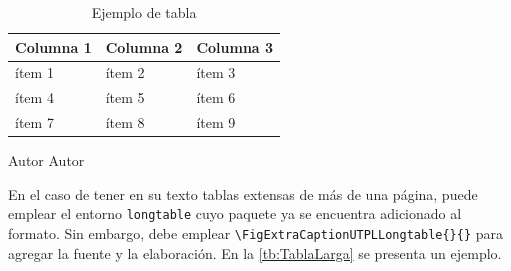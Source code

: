 \begin{table}[]
	\centering
	\captionsetup{width=0.44\textwidth}
	\caption{Ejemplo de tabla}
	\label{tb:Ejemplo}
	\begin{tabular}{|l|l|l|}
		\hline
		\textbf{Columna 1} & \textbf{Columna 2} & \textbf{Columna 3} \\ \hline
		ítem 1             & ítem 2             & ítem 3             \\ \hline
		ítem 4             & ítem 5             & ítem 6             \\ \hline
		ítem 7             & ítem 8             & ítem 9             \\ \hline
	\end{tabular}
	\vspace{3pt}
	\FigExtraCaptionUTPL		%
		{Autor}					%
		{Autor} 				%
\end{table}

En el caso de tener en su texto tablas extensas de más de una página, puede emplear el entorno \lstinline|longtable| cuyo paquete ya se encuentra adicionado al formato. Sin embargo, debe emplear \lstinline|\FigExtraCaptionUTPLLongtable{}{}| para agregar la fuente y la elaboración. En la \autoref{tb:TablaLarga} se presenta un ejemplo. 

